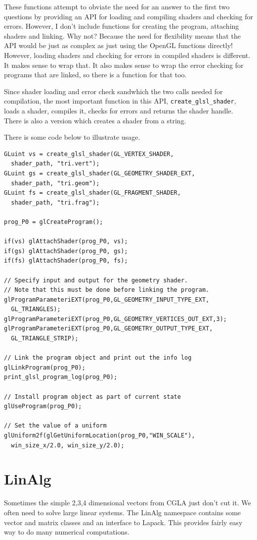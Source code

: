 \documentclass[a4paper]{article}
\begin{document}
These functions attempt to obviate the need for an answer to the first two questions by providing an API for loading and compiling shaders and checking for errors. However, I don't include functions for creating the program, attaching shaders and linking. Why not? Because the need for flexibility means that the API would be just as complex as just using the OpenGL functions directly! However, loading shaders and checking for errors in compiled shaders is different. It makes sense to wrap that. It also makes sense to wrap the error checking for programs that are linked, so there is a function for that too.

Since shader loading and error check sandwhich the two calls needed for compilation, the most important function in this API, \texttt{create\_glsl\_shader}, loads a shader, compiles it, checks for errors and returns the shader handle. There is also a version which creates a shader from a string.

There is some code below to illustrate usage.  
\begin{verbatim}
GLuint vs = create_glsl_shader(GL_VERTEX_SHADER, 
  shader_path, "tri.vert");
GLuint gs = create_glsl_shader(GL_GEOMETRY_SHADER_EXT, 
  shader_path, "tri.geom");
GLuint fs = create_glsl_shader(GL_FRAGMENT_SHADER, 
  shader_path, "tri.frag");

prog_P0 = glCreateProgram();

if(vs) glAttachShader(prog_P0, vs);
if(gs) glAttachShader(prog_P0, gs);
if(fs) glAttachShader(prog_P0, fs);

// Specify input and output for the geometry shader.
// Note that this must be done before linking the program.
glProgramParameteriEXT(prog_P0,GL_GEOMETRY_INPUT_TYPE_EXT,
  GL_TRIANGLES);
glProgramParameteriEXT(prog_P0,GL_GEOMETRY_VERTICES_OUT_EXT,3);
glProgramParameteriEXT(prog_P0,GL_GEOMETRY_OUTPUT_TYPE_EXT,
  GL_TRIANGLE_STRIP);

// Link the program object and print out the info log
glLinkProgram(prog_P0);
print_glsl_program_log(prog_P0);

// Install program object as part of current state
glUseProgram(prog_P0);

// Set the value of a uniform
glUniform2f(glGetUniformLocation(prog_P0,"WIN_SCALE"), 
  win_size_x/2.0, win_size_y/2.0);
\end{verbatim}

\section{LinAlg}
Sometimes the simple 2,3,4 dimensional vectors from CGLA just don't cut it. We often need to solve large linear systems. The LinAlg namespace contains some vector and matrix classes and an interface to Lapack. This provides fairly easy way to do many numerical computations.
\end{document}
